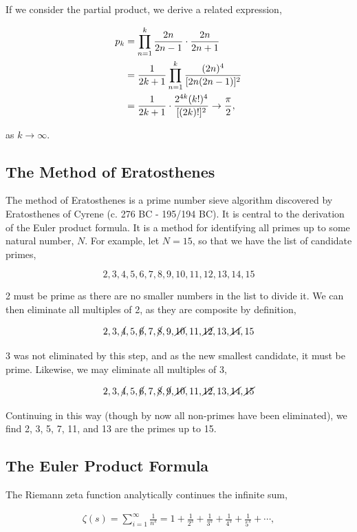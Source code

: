 \documentclass[11pt]{amsart}
\begin{document}
If we consider the partial product, we derive a related expression,

\begin{align}
p_k &= \prod_{n=1}^{k} \frac{2n}{2n - 1} \cdot \frac{2n}{2n + 1} \notag \\
&= \frac{1}{2k + 1} \prod_{n=1}^{k}\frac{(2n)^4}{[2n(2n - 1)]^2} \notag \\
&= \frac{1}{2k + 1} \cdot \frac{2^{4k}(k!)^4}{[(2k)!]^2} \to \frac{\pi}{2}, \notag
\end{align}

as $k \to \infty$.

\subsection{The Method of Eratosthenes}

The method of Eratosthenes is a prime number sieve algorithm discovered by Eratosthenes of Cyrene (c. 276 BC - 195/194 BC). It is central to the derivation of the Euler product formula. It is a method for identifying all primes up to some natural number, $N$. For example, let $N = 15$, so that we have the list of candidate primes,

$$2, 3, 4, 5, 6, 7, 8, 9, 10, 11, 12, 13, 14, 15$$

2 must be prime as there are no smaller numbers in the list to divide it. We can then eliminate all multiples of 2, as they are composite by definition,

$$2, 3, \cancel{4}, 5, \cancel{6}, 7, \cancel{8}, 9, \cancel{10}, 11, \cancel{12}, 13, \cancel{14}, 15$$

3 was not eliminated by this step, and as the new smallest candidate, it must be prime. Likewise, we may eliminate all multiples of 3,

$$2, 3, \cancel{4}, 5, \cancel{6}, 7, \cancel{8}, \cancel{9}, \cancel{10}, 11, \cancel{12}, 13, \cancel{14}, \cancel{15}$$

Continuing in this way (though by now all non-primes have been eliminated), we find 2, 3, 5, 7, 11, and 13 are the primes up to 15.

\subsection{The Euler Product Formula}

The Riemann zeta function analytically continues the infinite sum,

\begin{align}\zeta(s) = \sum_{i=1}^{\infty}\frac{1}{n^s} = 1 + \frac{1}{2^s} + \frac{1}{3^s} + \frac{1}{4^s} + \frac{1}{5^s} + \cdots,\label{eq:zeta}
\end{align}
\end{document}
